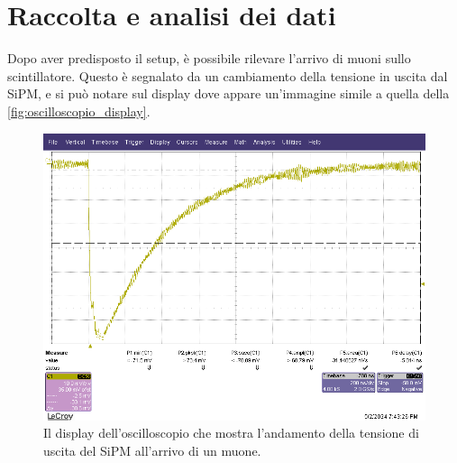 \section{Raccolta e analisi dei dati}
Dopo aver predisposto il setup, è possibile rilevare l'arrivo di muoni sullo scintillatore. Questo è segnalato da un cambiamento della
tensione in uscita dal SiPM, e si può notare sul display dove appare un'immagine simile a quella della \autoref*{fig:oscilloscopio_display}.
\begin{figure}[h!]
    \centering
    \includegraphics[width=.75\linewidth]{img/oscilloscopio_display.png}
    \caption{Il display dell'oscilloscopio che mostra l'andamento della tensione di uscita del SiPM all'arrivo di un muone.}
    \label{fig:oscilloscopio_display}
\end{figure}

